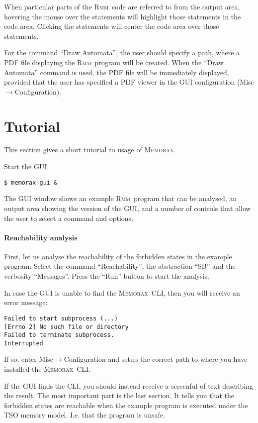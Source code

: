 \documentclass[a4paper]{article}
\newcommand{\memorax}{\textsc{Memorax}}
\newcommand{\rmm}{\textsc{Rmm}}
\begin{document}
When particular parts of the \rmm\ code are referred to from the output
area, hovering the mouse over the statements will highlight those
statements in the code area. Clicking the statements will center the
code area over those statements.

For the command ``Draw Automata'', the user should specify a path,
where a PDF file displaying the \rmm\ program will be created. When the
``Draw Automata'' command is used, the PDF file will be immediately
displayed, provided that the user has specified a PDF viewer in the
GUI configuration (Misc$\rightarrow$Configuration).

\section{Tutorial}

This section gives a short tutorial to usage of \memorax.

Start the GUI.

\noindent
\begin{verbatim}
$ memorax-gui &
\end{verbatim}

The GUI window shows an example \rmm\ program that can be analysed, an
output area showing the version of the GUI, and a number of controls
that allow the user to select a command and options.

\paragraph{Reachability analysis}
First, let us analyse the reachability of the forbidden states in the
example program: Select the command ``Reachability'', the abstraction
``SB'' and the verbosity ``Messages''. Press the ``Run'' button to
start the analysis.

In case the GUI is unable to find the \memorax\ CLI, then you will receive
an error message:

\noindent
\begin{verbatim}
Failed to start subprocess (...)
[Errno 2] No such file or directory
Failed to terminate subprocess.
Interrupted
\end{verbatim}

If so, enter Misc$\rightarrow$Configuration and setup the correct path
to where you have installed the \memorax\ CLI.

If the GUI finds the CLI, you should instead receive a screenful of
text describing the result. The most important part is the last
section. It tells you that the forbidden states are reachable when the
example program is executed under the TSO memory model. I.e. that the
program is unsafe.
\end{document}
